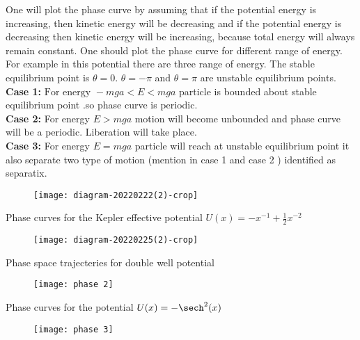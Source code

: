 \begin{answer}
	One will plot the phase curve by assuming that if the potential energy is increasing, then kinetic energy will be decreasing and if the potential energy is decreasing then kinetic energy will be increasing, because total energy will always remain constant. One should plot the phase curve for different range of energy. For example in this potential there are three range of energy.
	The stable equilibrium point is $\theta=0$. $\theta=-\pi$ and $\theta=\pi$ are unstable equilibrium points.\\
	\textbf{Case 1:}$\text { For energy }-m g a<E<m g a$  particle is bounded about stable equilibrium point .so phase curve is periodic.\\
	\textbf{Case 2:} For energy $E>m g a$ motion will become unbounded and phase curve will be a periodic. Liberation will take place.\\
	\textbf{Case 3:} For energy $E=m g a$ particle will reach at unstable equilibrium point it also separate two type of motion (mention in case 1 and case 2 ) identified as separatix.
	\begin{figure}[H]
		\centering
		\texttt{[image: diagram-20220222(2)-crop]}
	\end{figure}
\end{answer}
\begin{example}
	Phase curves for the Kepler effective potential $U(x)=-x^{-1}+\frac{1}{2}x^{-2}$
\end{example}
\begin{answer}
	\begin{figure}[H]
		\centering
		\texttt{[image: diagram-20220225(2)-crop]}
	\end{figure}
\end{answer}
\begin{example}
	Phase space trajecteries for double well potential
\end{example}
\begin{answer}
	\begin{figure}[H]
		\centering
		\texttt{[image: phase 2]}
	\end{figure}	
\end{answer}
\begin{example}
	Phase curves for the potential $U(x)=-\sech^2(x)$
\end{example}
\begin{answer}
	\begin{figure}[H]
		\centering
		\texttt{[image: phase 3]}
	\end{figure}	
\end{answer}




